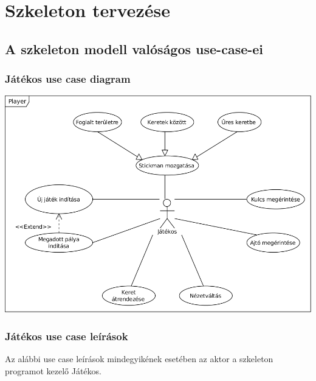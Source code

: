 

\usepackage{enumitem}



\fedlap

\addtocounter{section}{4}
\section{Szkeleton tervezése}

	\subsection{A szkeleton modell valóságos use-case-ei}
        \newcommand{\ucitem}[1]{\item \textbf{Use case neve: } #1\\}
        \newcommand{\ucdesc}[1]{\textbf{Leírás: } #1\\}
        \newcommand{\ucscenario}[1]{\textbf{Forgatókönyv: }#1\\}
        
		\subsubsection{Játékos use case diagram}
		    \begin{center}
			    \includegraphics[scale=0.9]{resources/Player.png}
		    \end{center}
		
		\subsubsection{Játékos use case leírások}
		    Az alábbi use case leírások mindegyikének esetében az aktor a szkeleton programot kezelő Játékos.
		    
